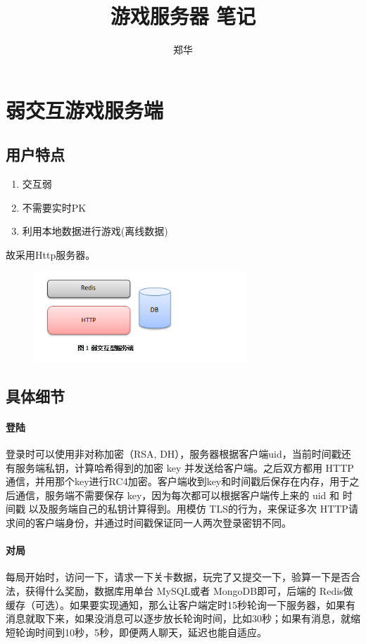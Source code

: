 \documentclass[UTF8,a4paper,8pt]{ctexart}
\author{\kaishu 郑华}
\title{游戏服务器 笔记}
\begin{document}
 	\maketitle
\newpage
  
\section{弱交互游戏服务端}

	\subsection{用户特点}
		\begin{enumerate}[fullwidth,itemindent = 2em]
			\item  交互弱
			\item  不需要实时PK
			\item  利用本地数据进行游戏(离线数据)
		\end{enumerate}
		
		故采用Http服务器。
     
	    \begin{figure}[h] 	
	    	\centering
	    	\includegraphics[width=8cm,clip]{weakServer.png} 	
	    	\label{fig:weakServer}
	    \end{figure} 
	    
	 \subsection{具体细节}
		 \paragraph{登陆}登录时可以使用非对称加密（RSA, DH），服务器根据客户端uid，当前时间戳还有服务端私钥，计算哈希得到的加密 key 并发送给客户端。之后双方都用 HTTP通信，并用那个key进行RC4加密。客户端收到key和时间戳后保存在内存，用于之后通信，服务端不需要保存 key，因为每次都可以根据客户端传上来的 uid 和 时间戳 以及服务端自己的私钥计算得到。用模仿 TLS的行为，来保证多次 HTTP请求间的客户端身份，并通过时间戳保证同一人两次登录密钥不同。
    
	    \paragraph{对局}每局开始时，访问一下，请求一下关卡数据，玩完了又提交一下，验算一下是否合法，获得什么奖励，数据库用单台 MySQL或者 MongoDB即可，后端的 Redis做缓存（可选）。如果要实现通知，那么让客户端定时15秒轮询一下服务器，如果有消息就取下来，如果没消息可以逐步放长轮询时间，比如30秒；如果有消息，就缩短轮询时间到10秒，5秒，即便两人聊天，延迟也能自适应。
	    
\end{document}
